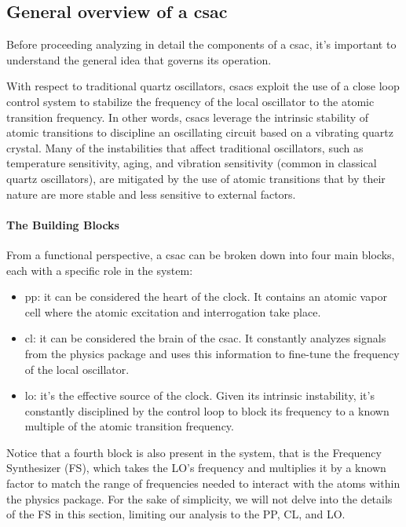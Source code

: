 \subsection{General overview of a \acrshort{csac}}
\label{subsec:general_overview}

Before proceeding analyzing in detail the components of a \acrshort{csac}, it's important to understand the general idea that governs its operation.

With respect to traditional quartz oscillators, \acrshort{csacs} exploit the use of a close loop control system to stabilize the frequency of the local oscillator to the atomic transition frequency.
In other words, \acrshort{csacs} leverage the intrinsic stability of atomic transitions to discipline an oscillating circuit based on a vibrating quartz crystal.
Many of the instabilities that affect traditional oscillators, such as temperature sensitivity, aging, and vibration sensitivity (common in classical quartz oscillators), are mitigated by the use of atomic transitions that by their nature are more stable and less sensitive to external factors.

\paragraph{The Building Blocks}

From a functional perspective, a \acrshort{csac} can be broken down into four main blocks, each with a specific role in the system:

\begin{itemize}
    \item \acrfull{pp}: it can be considered the heart of the clock. It contains an atomic vapor cell where the atomic excitation and interrogation take place.
    \item \acrfull{cl}: it can be considered the brain of the \acrshort{csac}. It constantly analyzes signals from the physics package and uses this information to fine-tune the frequency of the local oscillator.
    \item \acrfull{lo}: it's the effective source of the clock. Given its intrinsic instability, it's constantly disciplined by the control loop to block its frequency to a known multiple of the atomic transition frequency.
\end{itemize}

Notice that a fourth block is also present in the system, that is the Frequency Synthesizer (FS), which takes the LO's frequency and multiplies it by a known factor to match the range of frequencies needed to interact with the atoms within the physics package.
For the sake of simplicity, we will not delve into the details of the FS in this section, limiting our analysis to the PP, CL, and LO.

